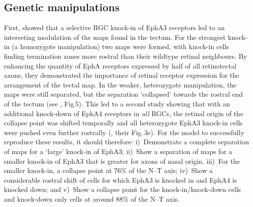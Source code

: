 \documentclass[9pt,lineno,draft]{elife}
\begin{document}
\subsection*{Genetic manipulations}


First, \citet{brown_topographic_2000} showed that a selective RGC knock-in of EphA3 receptors led to an interesting modulation of the maps found in the tectum.
For the strongest knock-in (a homozygote manipulation) two maps were formed, with knock-in cells finding termination zones more rostral than their wildtype retinal neighbours.
By enhancing the quantity of EphA receptors expressed by half of all retinotectal axons, they demonstrated the importance of retinal receptor expression for the arrangement of the tectal map.
In the weaker, heterozygote manipulation, the maps were still separated, but the separation `collapsed' towards the rostral end of the tectum (see \citet{brown_topographic_2000}, Fig\,5).
This led to a second study showing that with an additional knock-down of EphA4 receptors in \emph{all} RGCs, the retinal origin of the collapse point was shifted temporally and all heterozygote EphA3 knock-in cells were pushed even further rostrally (\citet{reber_relative_2004}, their Fig.\,3e).
For the model to successfully reproduce these results, it should therefore: i)~Demonstrate a complete separation of maps for a `large' knock-in of EphA3; ii)~Show a separation of maps for a smaller knock-in of EphA3 that is greater for axons of nasal origin. iii)~For the smaller knock-in, a collapse point at 76\% of the N--T axis; iv)~Show a considerable rostral shift of cells for which EphA3 is knocked in and EphA4 is knocked down; and v)~Show a collapse point for the knock-in/knock-down cells and knock-down only cells at around 88\% of the N--T axis.
\end{document}

